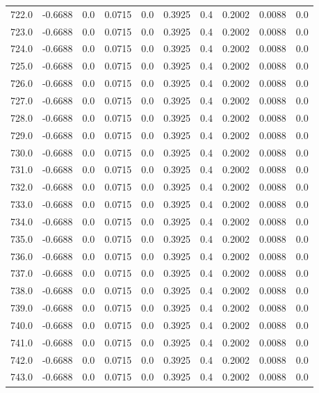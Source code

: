 \begin{longtable}{lrrrrrrrrr}
722.0 & -0.6688 & 0.0 & 0.0715 & 0.0 & 0.3925 & 0.4 & 0.2002 & 0.0088 & 0.0 \\
723.0 & -0.6688 & 0.0 & 0.0715 & 0.0 & 0.3925 & 0.4 & 0.2002 & 0.0088 & 0.0 \\
724.0 & -0.6688 & 0.0 & 0.0715 & 0.0 & 0.3925 & 0.4 & 0.2002 & 0.0088 & 0.0 \\
725.0 & -0.6688 & 0.0 & 0.0715 & 0.0 & 0.3925 & 0.4 & 0.2002 & 0.0088 & 0.0 \\
726.0 & -0.6688 & 0.0 & 0.0715 & 0.0 & 0.3925 & 0.4 & 0.2002 & 0.0088 & 0.0 \\
727.0 & -0.6688 & 0.0 & 0.0715 & 0.0 & 0.3925 & 0.4 & 0.2002 & 0.0088 & 0.0 \\
728.0 & -0.6688 & 0.0 & 0.0715 & 0.0 & 0.3925 & 0.4 & 0.2002 & 0.0088 & 0.0 \\
729.0 & -0.6688 & 0.0 & 0.0715 & 0.0 & 0.3925 & 0.4 & 0.2002 & 0.0088 & 0.0 \\
730.0 & -0.6688 & 0.0 & 0.0715 & 0.0 & 0.3925 & 0.4 & 0.2002 & 0.0088 & 0.0 \\
731.0 & -0.6688 & 0.0 & 0.0715 & 0.0 & 0.3925 & 0.4 & 0.2002 & 0.0088 & 0.0 \\
732.0 & -0.6688 & 0.0 & 0.0715 & 0.0 & 0.3925 & 0.4 & 0.2002 & 0.0088 & 0.0 \\
733.0 & -0.6688 & 0.0 & 0.0715 & 0.0 & 0.3925 & 0.4 & 0.2002 & 0.0088 & 0.0 \\
734.0 & -0.6688 & 0.0 & 0.0715 & 0.0 & 0.3925 & 0.4 & 0.2002 & 0.0088 & 0.0 \\
735.0 & -0.6688 & 0.0 & 0.0715 & 0.0 & 0.3925 & 0.4 & 0.2002 & 0.0088 & 0.0 \\
736.0 & -0.6688 & 0.0 & 0.0715 & 0.0 & 0.3925 & 0.4 & 0.2002 & 0.0088 & 0.0 \\
737.0 & -0.6688 & 0.0 & 0.0715 & 0.0 & 0.3925 & 0.4 & 0.2002 & 0.0088 & 0.0 \\
738.0 & -0.6688 & 0.0 & 0.0715 & 0.0 & 0.3925 & 0.4 & 0.2002 & 0.0088 & 0.0 \\
739.0 & -0.6688 & 0.0 & 0.0715 & 0.0 & 0.3925 & 0.4 & 0.2002 & 0.0088 & 0.0 \\
740.0 & -0.6688 & 0.0 & 0.0715 & 0.0 & 0.3925 & 0.4 & 0.2002 & 0.0088 & 0.0 \\
741.0 & -0.6688 & 0.0 & 0.0715 & 0.0 & 0.3925 & 0.4 & 0.2002 & 0.0088 & 0.0 \\
742.0 & -0.6688 & 0.0 & 0.0715 & 0.0 & 0.3925 & 0.4 & 0.2002 & 0.0088 & 0.0 \\
743.0 & -0.6688 & 0.0 & 0.0715 & 0.0 & 0.3925 & 0.4 & 0.2002 & 0.0088 & 0.0 \\

\end{longtable}
